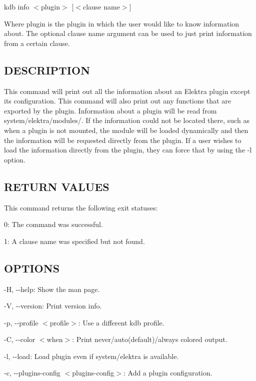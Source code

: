 {\ttfamily kdb info $<$plugin$>$ \mbox{[}$<$clause name$>$\mbox{]}}

Where {\ttfamily plugin} is the plugin in which the user would like to know information about. The optional {\ttfamily clause name} argument can be used to just print information from a certain clause.

\subsection*{D\+E\+S\+C\+R\+I\+P\+T\+I\+ON}

This command will print out all the information about an Elektra plugin except it\textquotesingle{}s configuration. This command will also print out any functions that are exported by the plugin. Information about a plugin will be read from {\ttfamily system/elektra/modules/}. If the information could not be located there, such as when a plugin is not mounted, the module will be loaded dynamically and then the information will be requested directly from the plugin. If a user wishes to load the information directly from the plugin, they can force that by using the {\ttfamily -\/l} option.

\subsection*{R\+E\+T\+U\+RN V\+A\+L\+U\+ES}

This command returns the following exit statuses\+:


\begin{DoxyItemize}
\item 0\+: The command was successful.
\item 1\+: A {\ttfamily clause name} was specified but not found.
\end{DoxyItemize}

\subsection*{O\+P\+T\+I\+O\+NS}


\begin{DoxyItemize}
\item {\ttfamily -\/H}, {\ttfamily -\/-\/help}\+: Show the man page.
\item {\ttfamily -\/V}, {\ttfamily -\/-\/version}\+: Print version info.
\item {\ttfamily -\/p}, {\ttfamily -\/-\/profile $<$profile$>$}\+: Use a different kdb profile.
\item {\ttfamily -\/C}, {\ttfamily -\/-\/color $<$when$>$}\+: Print never/auto(default)/always colored output.
\item {\ttfamily -\/l}, {\ttfamily -\/-\/load}\+: Load plugin even if system/elektra is available.
\item {\ttfamily -\/c}, {\ttfamily -\/-\/plugins-\/config $<$plugins-\/config$>$}\+: Add a plugin configuration.
\end{DoxyItemize}

